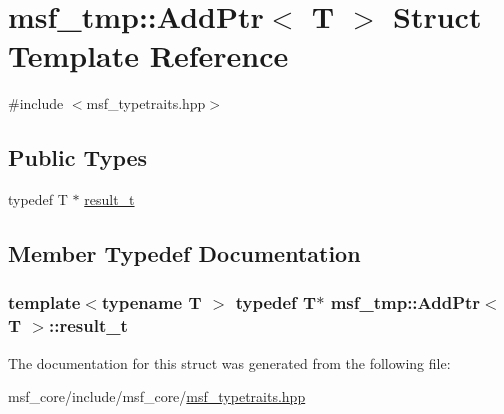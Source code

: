 \hypertarget{structmsf__tmp_1_1AddPtr}{\section{msf\-\_\-tmp\-:\-:Add\-Ptr$<$ T $>$ Struct Template Reference}
\label{structmsf__tmp_1_1AddPtr}
}


{\ttfamily \#include $<$msf\-\_\-typetraits.\-hpp$>$}

\subsection*{Public Types}
\begin{DoxyCompactItemize}
\item 
typedef T $\ast$ \hyperlink{structmsf__tmp_1_1AddPtr_a6c4251215d0036665b0f3f956a3d899b}{result\-\_\-t}
\end{DoxyCompactItemize}


\subsection{Member Typedef Documentation}
\hypertarget{structmsf__tmp_1_1AddPtr_a6c4251215d0036665b0f3f956a3d899b}{
\subsubsection[{result\-\_\-t}]{\setlength{\rightskip}{0pt plus 5cm}template$<$typename T $>$ typedef T$\ast$ {\bf msf\-\_\-tmp\-::\-Add\-Ptr}$<$ T $>$\-::{\bf result\-\_\-t}}}\label{structmsf__tmp_1_1AddPtr_a6c4251215d0036665b0f3f956a3d899b}


The documentation for this struct was generated from the following file\-:\begin{DoxyCompactItemize}
\item 
msf\-\_\-core/include/msf\-\_\-core/\hyperlink{msf__typetraits_8hpp}{msf\-\_\-typetraits.\-hpp}\end{DoxyCompactItemize}

